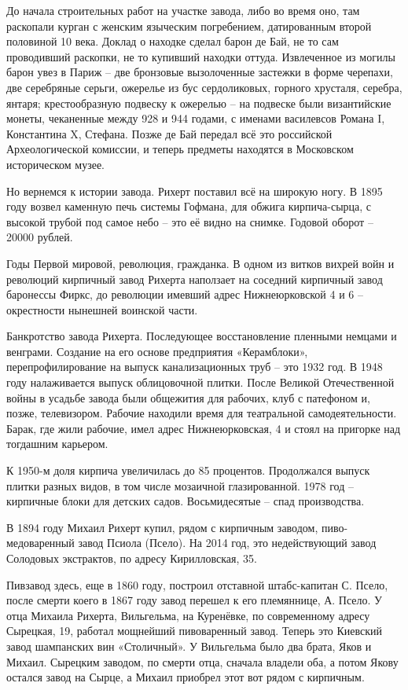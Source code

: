 До начала строительных работ на участке завода, либо во время оно, там раскопали курган с женским языческим погребением, датированным второй половиной 10 века. Доклад о находке сделал барон де Бай, не то сам проводивший раскопки, не то купивший находки оттуда. Извлеченное из могилы барон увез в Париж – две бронзовые вызолоченные застежки в форме черепахи, две серебряные серьги, ожерелье из бус сердоликовых, горного хрусталя, серебра, янтаря; крестообразную подвеску к ожерелью – на подвеске были византийские монеты, чеканенные между 928 и 944 годами, с именами василевсов Романа I, Константина X, Стефана. Позже де Бай передал всё это российской Археологической комиссии, и теперь предметы находятся в Московском историческом музее.

Но вернемся к истории завода. Рихерт поставил всё на широкую ногу. В 1895 году возвел каменную печь системы Гофмана, для обжига кирпича-сырца, с высокой трубой под самое небо – это её видно на снимке. Годовой оборот – 20000 рублей.

Годы Первой мировой, революция, гражданка. В одном из витков вихрей войн и революций кирпичный завод Рихерта наползает на соседний кирпичный завод баронессы Фиркс, до революции имевший адрес Нижнеюрковской 4 и 6 – окрестности нынешней воинской части.

Банкротство завода Рихерта. Последующее восстановление пленными немцами и венграми. Создание на его основе предприятия «Керамблоки», перепрофилирование на выпуск канализационных труб – это 1932 год. В 1948 году налаживается выпуск облицовочной плитки. После Великой Отечественной войны в усадьбе завода были общежития для рабочих, клуб с патефоном и, позже, телевизором. Рабочие находили время для театральной самодеятельности. Барак, где жили рабочие, имел адрес Нижнеюрковская, 4 и стоял на пригорке над тогдашним карьером.

К 1950-м доля кирпича увеличилась до 85 процентов. Продолжался выпуск плитки разных видов, в том числе мозаичной глазированной. 1978 год – кирпичные блоки для детских садов. Восьмидесятые – спад производства.

В 1894 году Михаил Рихерт купил, рядом с кирпичным заводом, пиво-медоваренный завод Псиола (Псело). На 2014 год, это недействующий завод Солодовых экстрактов, по адресу Кирилловская, 35. 

Пивзавод здесь, еще в 1860 году, построил отставной штабс-капитан С. Псело, после смерти коего в 1867 году завод перешел к его племяннице, А. Псело. У отца Михаила Рихерта, Вильгельма, на Куренёвке, по современному адресу Сырецкая, 19, работал мощнейший пивоваренный завод. Теперь это Киевский завод шампанских вин «Столичный». У Вильгельма было два брата, Яков и Михаил. Сырецким заводом, по смерти отца, сначала владели оба, а потом Якову остался завод на Сырце, а Михаил приобрел этот вот рядом с кирпичным.

